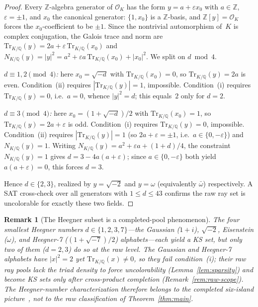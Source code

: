 \documentclass[12pt,a4paper]{article}
\newtheorem{remark}{Remark}
\newcommand{\Z}{\mathbb{Z}}
\newcommand{\Q}{\mathbb{Q}}
\newcommand{\Norm}[1]{N_{K/\Q}\!\left(#1\right)}
\newcommand{\Tr}[1]{\mathrm{Tr}_{K/\Q}\!\left(#1\right)}
\begin{document}
\begin{proof}
Every $\Z$-algebra generator of $\mathcal{O}_K$ has the form
$y = a + \varepsilon x_0$ with $a \in \Z$, $\varepsilon = \pm 1$, and
$x_0$ the canonical generator: $\{1, x_0\}$ is a $\Z$-basis, and
$\Z[y] = \mathcal{O}_K$ forces the $x_0$-coefficient to be $\pm 1$.
Since the nontrivial automorphism of~$K$ is complex conjugation, the
Galois trace and norm are $\Tr{y} = 2a + \varepsilon\,\Tr{x_0}$ and
$\Norm{y} = |y|^2 = a^2 + \varepsilon a\,\Tr{x_0} + |x_0|^2$.  We split
on $d \bmod 4$.

\emph{$d \equiv 1, 2 \pmod 4$:} here $x_0 = \sqrt{-d}$ with
$\Tr{x_0} = 0$, so $\Tr{y} = 2a$ is even.  Condition~(ii) requires
$|\Tr{y}| = 1$, impossible.  Condition~(i) requires $\Tr{y} = 0$,
i.e.\ $a = 0$, whence $|y|^2 = d$; this equals~$2$ only for $d = 2$.

\emph{$d \equiv 3 \pmod 4$:} here $x_0 = (1{+}\sqrt{-d})/2$ with
$\Tr{x_0} = 1$, so $\Tr{y} = 2a + \varepsilon$ is odd.  Condition~(i)
requires $\Tr{y} = 0$, impossible.  Condition~(ii) requires
$|\Tr{y}| = 1$ (so $2a + \varepsilon = \pm 1$, i.e.\
$a \in \{0, -\varepsilon\}$) and $\Norm{y} = 1$.  Writing
$\Norm{y} = a^2 + \varepsilon a + (1{+}d)/4$, the constraint
$\Norm{y} = 1$ gives $d = 3 - 4a(a + \varepsilon)$; since
$a \in \{0, -\varepsilon\}$ both yield $a(a + \varepsilon) = 0$, this
forces $d = 3$.

Hence $d \in \{2, 3\}$, realized by $y = \sqrt{-2}$ and $y = \omega$
(equivalently $\bar\omega$) respectively.  A SAT cross-check over all
generators with $1 \leq d \leq 43$ confirms the raw ray set is
uncolorable for exactly these two fields.
\end{proof}

\begin{remark}[The Heegner subset is a completed-pool phenomenon]
The four smallest Heegner numbers $d \in \{1, 2, 3, 7\}$---the Gaussian
($1{+}i$), $\sqrt{-2}$, Eisenstein ($\omega$), and Heegner-7
($(1{+}\sqrt{-7})/2$) alphabets---each yield a KS set, but only two of
them ($d = 2, 3$) do so at the \emph{raw} level.  The Gaussian and
Heegner-7 alphabets have $|x|^2 = 2$ yet $\Tr{x} \neq 0$, so they fail
condition~(i); their raw ray pools lack the triad density to force
uncolorability (Lemma~\ref{lem:sparsity}) and become KS sets only after
cross-product completion (Remark~\ref{rem:raw-scope}).  The Heegner-number
characterization therefore belongs to the completed six-island
picture~\cite{Kernaghan2026islands}, not to the raw classification of
Theorem~\ref{thm:main}.
\end{remark}
\end{document}
